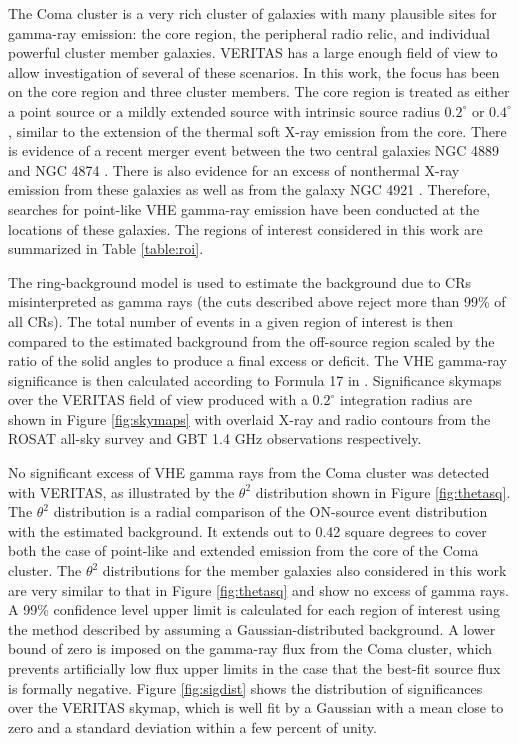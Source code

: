 \documentclass[12pt,manuscript]{aastex}
\begin{document}
The Coma cluster is a very rich cluster of galaxies with many plausible sites for gamma-ray
emission: the core region, the peripheral radio relic, and individual powerful cluster
member galaxies. VERITAS has a large enough field of view to allow investigation of several of
these scenarios. In this work, the focus has been on the core region and three cluster members. The
core region is treated as either a point
source or a mildly extended source with intrinsic source radius $0.2^{\circ}$ or $0.4^{\circ}$,
similar to the extension of the thermal soft X-ray emission from the core. There
is evidence of a recent merger event between the two central galaxies NGC 4889 and NGC 4874
\citep{article:Tribble:1993}. There is also evidence for an excess of nonthermal X-ray emission
from these galaxies as well as from the galaxy NGC 4921 \citep{article:Neumann_etal:2003}.
Therefore, searches for point-like VHE gamma-ray emission have been conducted at the locations of
these galaxies. The regions of interest considered in this work are summarized in Table
\ref{table:roi}.

The ring-background model \citep{article:Aharonian_etal:2001} is used to estimate the background
due to CRs misinterpreted as gamma rays (the cuts described above reject more than 99\% of all
CRs). The total number of events in a given region of interest is then compared to the estimated
background from the off-source region scaled by the ratio of the solid angles to produce a final
excess or deficit. The VHE gamma-ray significance is then calculated according to Formula 17 in
\citet{article:LiMa:1983}. Significance skymaps over the VERITAS field of view produced with a
$0.2^{\circ}$ integration radius are shown in Figure \ref{fig:skymaps} with overlaid X-ray and radio
contours from the ROSAT all-sky survey \citep{article:BrielHenryBohringer:1992}  and GBT 1.4 GHz
observations \citep{article:BrownRudnick:2010} respectively.

No significant excess of VHE gamma rays from the Coma cluster was detected with VERITAS, as
illustrated by the $\theta^{2}$ distribution shown in Figure \ref{fig:thetasq}. The $\theta^{2}$
distribution is a radial comparison of the ON-source event distribution with the estimated
background. It extends out to 0.42 square degrees to cover both the case of point-like and extended
emission from the core of the Coma cluster. The $\theta^{2}$ distributions for the member galaxies
also considered in this work are very similar to that in Figure \ref{fig:thetasq} and show no
excess of gamma rays. A 99\% confidence level upper limit is calculated for each region of
interest using the method described by \citet{article:Rolke_etal:2005} assuming a
Gaussian-distributed background. A lower bound of zero is imposed on the gamma-ray flux from the Coma cluster, which prevents artificially low flux upper limits in the case that the best-fit source flux is formally negative. Figure \ref{fig:sigdist} shows the
distribution of significances over the VERITAS skymap, which is well fit by a Gaussian with a mean
close to zero and a standard deviation within a few percent of unity.
\end{document}
